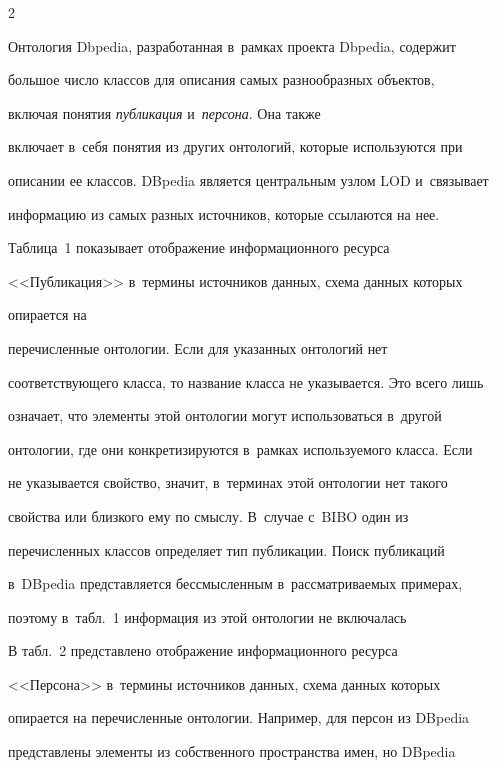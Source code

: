 \begin{multicols}{2}
     

    Онтология Dbpedia, разработанная в~рамках проекта Dbpedia, содержит 

большое число классов для описания самых разнообразных объектов, 

включая понятия \textit{пуб\-ли\-ка\-ция} и~\textit{персона}. Она также 

включает в~себя понятия из других онтологий, которые используются при 

описании ее классов. DBpedia является центральным узлом LOD и~связывает 

информацию из самых разных источников, которые ссылаются на нее. 





    

    Таблица~1 показывает отображение информационного ресурса 

<<Публикация>> в~термины источников данных, схема данных которых 

опирается на

 перечисленные онтологии. Если для указанных онтологий нет 

соответствующего класса, то название класса не указывается. Это всего лишь 

означает, что элементы этой онтологии могут использоваться в~другой 

онтологии, где они конкретизируются в~рамках используемого класса. Если 

не указывается свойство, значит, в~терминах этой онтологии нет такого 

свойства или близкого ему по смыслу. В~случае с~BIBO один из 

перечисленных классов определяет тип публикации. Поиск публикаций 

в~DBpedia представляется бессмысленным в~рассматриваемых примерах, 

поэтому в~табл.~1 информация из этой онтологии не включалась





    В табл.~2 представлено отображение информационного ресурса 

<<Персона>> в~термины источников данных, схема данных которых 

опирается на перечисленные онтологии. Например, для персон из DBpedia 

представлены элементы из собственного пространства имен, но DBpedia 


\end{multicols}
